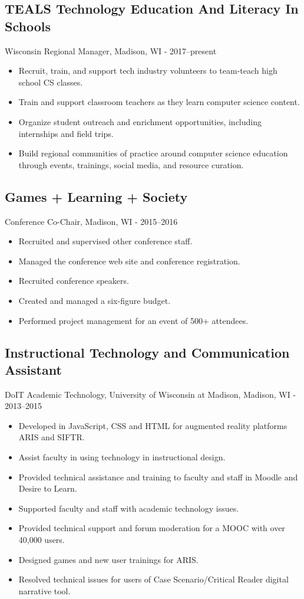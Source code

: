 \documentclass[../main.tex]{subfiles}
\begin{document}
\subsection*{TEALS Technology Education And Literacy In Schools}
     Wisconsin Regional Manager, Madison, WI - 2017--present
	\begin{itemize}
		\item{Recruit, train, and support tech industry volunteers to team-teach high school CS classes.}
		\item{Train and support classroom teachers as they learn computer science content.}
		\item{Organize student outreach and enrichment opportunities, including internships and field trips.}
		\item{Build regional communities of practice around computer science education through events, trainings, social media, and resource curation.}
	\end{itemize}

\subsection*{Games + Learning + Society }
     Conference Co-Chair, Madison, WI - 2015--2016
	\begin{itemize}
		\item{Recruited and supervised other conference staff.}
		\item{Managed the conference web site and conference registration.}
		\item{Recruited conference speakers.}
		\item{Created and managed a six-figure budget.}
		\item{Performed project management for an event of 500+ attendees.}
	\end{itemize}

\subsection*{Instructional Technology and Communication Assistant}
     DoIT Academic Technology, University of Wisconsin at Madison, Madison, WI - 2013--2015
	\begin{itemize}
		\item{Developed in JavaScript, CSS and HTML for augmented reality platforms ARIS and SIFTR.}
		\item{Assist faculty in using technology in instructional design.}
		\item{Provided technical assistance and training to faculty and staff in Moodle and Desire to Learn.}
		\item{Supported faculty and staff with academic technology issues.}
		\item{Provided technical support and forum moderation for a MOOC with over 40,000 users.}
		\item{Designed games and new user trainings for ARIS.}
		\item{Resolved technical issues for users of Case Scenario/Critical Reader digital narrative tool.}
	\end{itemize}
\end{document}
